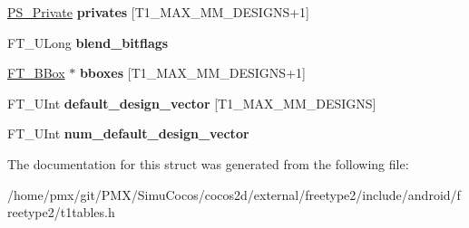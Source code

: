 \begin{DoxyCompactItemize}
\hyperlink{structPS__PrivateRec__}{P\+S\+\_\+\+Private} {\bfseries privates} \mbox{[}T1\+\_\+\+M\+A\+X\+\_\+\+M\+M\+\_\+\+D\+E\+S\+I\+G\+NS+1\mbox{]}
\item 
\mbox{\label{structPS__BlendRec___a86caa5319e208b4a2057db656bad9221}} 
F\+T\+\_\+\+U\+Long {\bfseries blend\+\_\+bitflags}
\item 
\mbox{\label{structPS__BlendRec___a45f596c6f75802e814dc7d18cc538ff7}} 
\hyperlink{structFT__BBox__}{F\+T\+\_\+\+B\+Box} $\ast$ {\bfseries bboxes} \mbox{[}T1\+\_\+\+M\+A\+X\+\_\+\+M\+M\+\_\+\+D\+E\+S\+I\+G\+NS+1\mbox{]}
\item 
\mbox{\label{structPS__BlendRec___a652c5fbb1ebec5a8d2dfb9df7fd027ea}} 
F\+T\+\_\+\+U\+Int {\bfseries default\+\_\+design\+\_\+vector} \mbox{[}T1\+\_\+\+M\+A\+X\+\_\+\+M\+M\+\_\+\+D\+E\+S\+I\+G\+NS\mbox{]}
\item 
\mbox{\label{structPS__BlendRec___afa5c7dd4206eb8a1d9ef4894abfc9555}} 
F\+T\+\_\+\+U\+Int {\bfseries num\+\_\+default\+\_\+design\+\_\+vector}
\end{DoxyCompactItemize}


The documentation for this struct was generated from the following file\+:\begin{DoxyCompactItemize}
\item 
/home/pmx/git/\+P\+M\+X/\+Simu\+Cocos/cocos2d/external/freetype2/include/android/freetype2/t1tables.\+h\end{DoxyCompactItemize}
